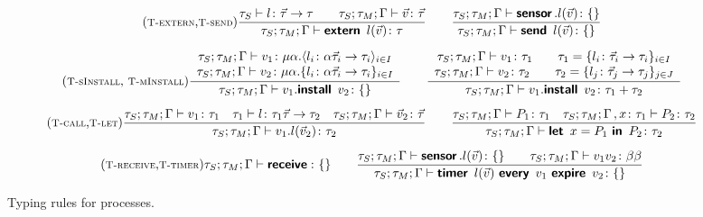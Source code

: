 \documentclass[copyright,creativecommons]{eptcs}
\newcommand{\keyw}[1]{\textbf{\textsf{#1}}\,}
\newcommand{\installk}{\keyw{install}}
\newcommand{\ink}{\keyw{in}}
\newcommand{\systemk}{\keyw{extern}}
\newcommand{\letk}{\keyw{let}}
\newcommand{\sendk}{\keyw{send}}
\newcommand{\firek}{\keyw{timer}}
\newcommand{\everyk}{\keyw{every}}
\newcommand{\expirek}{\keyw{expire}}
\newcommand{\receivek}{\keyw{receive}}
\newcommand{\branek}{\keyw{sensor}}
\newcommand{\invk}[3]{{#1}.{#2}({#3})}
\newcommand{\system}[1]{\systemk\ {#1}}
\newcommand{\systemd}{\system {\msgd}}
\newcommand{\fire}[3]{\firek\ {#1}\ \everyk\ {#2}\ \expirek\ {#3}}
\newcommand{\send}[1]{\sendk\ {#1}}
\newcommand{\sendd}{\send {\msgd}}
\newcommand{\msg}[2]{{#1}({#2})}
\newcommand{\msgd}{\msg l {\vec v}}
\newcommand{\receivedd}{\receivek}
\newcommand{\install}[2]{{#1}.\installk\ {#2}}
\newcommand{\Let}[3]{\letk\ {#1} = {#2}\ \ink\ {#3}}
\def\obj#1{\{#1\}}
\def\anyObj#1{\langle {#1} \rangle}
\newcommand{\functionType}[2]{{#1} \rightarrow {#2}}
\newcommand{\functionTyped}{\functionType {\vec \tau} {\tau}}
\newcommand{\recType}[2]{\mu {#1}.{#2}}
\newcommand{\disj}{\operatorname{,}}
\newcommand{\mkTrule}[1]{{\footnotesize \textsc{T-#1}}}
\newcommand{\type}{\vdash}
\newcommand{\Tlet}{\mkTrule{let}}
\newcommand{\Tfire}{\mkTrule{timer}}
\newcommand{\Treceive}{\mkTrule{receive}}
\newcommand{\Tcall}{\mkTrule{call}}
\newcommand{\TsCall}{\mkTrule{extern}}
\newcommand{\TinstS}{\mkTrule{sInstall}}
\newcommand{\TinstM}{\mkTrule{mInstall}}
\newcommand{\Tbcast}{\mkTrule{send}}
\newcommand{\seqSets}[3]{{#1}; {#2}; {#3}}
\newcommand{\seqSetsd}{\seqSets {\tau_S} {\tau_M} {\Gamma}}
\newcommand{\rulespace}{0.2cm}
\begin{document}
\begin{figure}
\begin{gather*}
    \tag{\TsCall,\Tbcast}
    \frac{
      \tau_S \type l \colon \functionTyped
      \qquad
      \seqSetsd \type \vec v \colon \vec \tau
    }
    {
      \seqSetsd \type \systemd \colon \tau
    }
    \qquad
    \frac{
      \seqSetsd \type \invk \branek l {\vec v} \colon \obj{}
    }
    {
      \seqSetsd \type \sendd \colon \obj{}
    }
    \\[\rulespace]    
    \tag{\TinstS, \TinstM}
    \frac{
      \begin{array}{c}
        \seqSetsd \type v_1 \colon 
           \recType \alpha {\anyObj {l_i \colon \alpha \vec \tau_i \rightarrow \tau_i}_{i \in I}}\\
        \seqSetsd \type v_2 \colon 
           \recType \alpha {\obj {l_i \colon \alpha \vec \tau_i \rightarrow \tau_i}_{i \in I}}
      \end{array}
    }
    {
      \seqSetsd \type \install {v_1} {v_2} \colon \obj{}
    }
    \qquad
    \frac{
     \begin{array}{c}
       \seqSetsd \type v_1 \colon \tau_1
       \qquad
       \tau_1 = \obj{l_i \colon \vec \tau_i \rightarrow \tau_i}_{i \in I}\\
       \seqSetsd \type v_2 \colon \tau_2
       \qquad
       \tau_2 = \obj{l_j \colon \vec \tau_j \rightarrow \tau_j}_{j \in J}
     \end{array}
   }
    {
      \seqSetsd \type \install {v_1} {v_2} \colon \tau_1 + \tau_2
    }
    \\[\rulespace]
   \tag{\Tcall,\Tlet}
    \frac{
      \seqSetsd \type v_1 \colon \tau_1
      \quad
      \tau_1 \type l \colon \functionType {\tau_1 \vec \tau}{\tau_2}
      \quad 
      \seqSetsd \type \vec v_2 \colon \vec \tau
    }
    {
      \seqSetsd \type \invk {v_1} {l} {\vec v_2} \colon \tau_2
    }
    \qquad
    \frac{
      \seqSetsd \type P_1 \colon \tau_1
      \quad
      \seqSetsd \disj x \colon \tau_1 \type P_2 \colon \tau_2
    }
    {
      \seqSetsd \type \Let x {P_1} {P_2} \colon \tau_2
    }
    \\[\rulespace]
    \tag{\Treceive,\Tfire}
    \seqSetsd \type \receivedd \colon \obj{}
    \qquad
    \frac{
      \seqSetsd \type \invk \branek l {\vec v} \colon \obj{}
      \qquad
      \seqSetsd \type v_1 v_2 \colon \beta \beta
    }
    {
      \seqSetsd \type \fire {\msgd} {v_1} {v_2} \colon \obj{}
    }
 \end{gather*}
\caption{Typing rules for processes.}
\label{fig:type-system-processes}
\end{figure}
\end{document}
